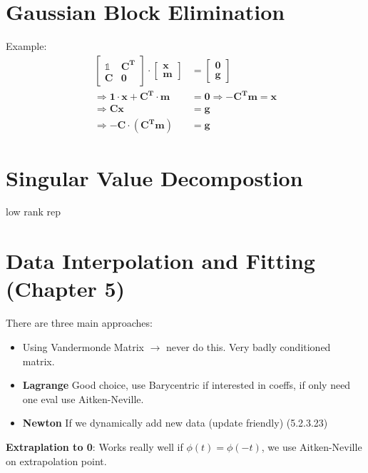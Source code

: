 \documentclass{sciposter}
\renewcommand{\vec}[1]{\mathbf{#1}}
\begin{document}
\begin{multicols}{2}
\section{Gaussian Block Elimination}
Example:\begin{align*}
\begin{bmatrix}
\vec{\mathbb{1}} & \vec{C^T} \\
\vec{C} & \vec{0}
\end{bmatrix} \cdot \begin{bmatrix}
\vec{x} \\ \vec{m}
\end{bmatrix} &= \begin{bmatrix}
\vec{0} \\ \vec{g}
\end{bmatrix}\\
\Rightarrow \vec{1\cdot x} + \vec{C^T\cdot m} &= \vec{0} \Rightarrow -\vec{C^T}\vec{m} = \vec{x}\\
\Rightarrow \vec{C x} &= \vec{g} \\
\Rightarrow \vec{-C}\cdot( \vec{C^Tm}) &= \vec{g}
\end{align*}

\section{Singular Value Decompostion}
low rank rep





\section{Data Interpolation and Fitting (Chapter 5)}


There are three main approaches:

\begin{itemize}
	\item Using Vandermonde Matrix $\rightarrow$ never do this. Very badly conditioned matrix.
	\item \textbf{Lagrange} Good choice, use Barycentric if interested in coeffs, if only need one eval use Aitken-Neville.
	\item \textbf{Newton} If we dynamically add new data (update friendly) (5.2.3.23)
\end{itemize}


\textbf{Extraplation to 0}: Works really well if $\phi(t) = \phi(-t)$, we use Aitken-Neville on extrapolation point.



\end{multicols}
\end{document}
